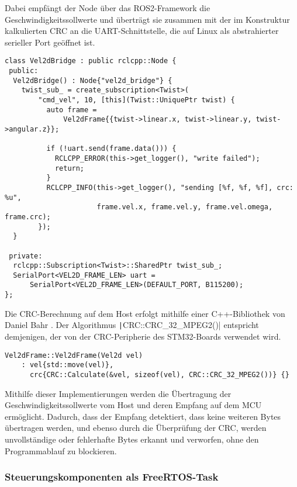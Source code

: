 Dabei empfängt der Node über das ROS2-Framework die Geschwindigkeitssollwerte
und überträgt sie zusammen mit der im Konstruktur kalkulierten CRC an die
UART-Schnittstelle, die auf Linux als abstrahierter serieller Port geöffnet ist.

\begin{code}
\begin{verbatim}
class Vel2dBridge : public rclcpp::Node {
 public:
  Vel2dBridge() : Node{"vel2d_bridge"} {
    twist_sub_ = create_subscription<Twist>(
        "cmd_vel", 10, [this](Twist::UniquePtr twist) {
          auto frame =
              Vel2dFrame{{twist->linear.x, twist->linear.y, twist->angular.z}};

          if (!uart.send(frame.data())) {
            RCLCPP_ERROR(this->get_logger(), "write failed");
            return;
          }
          RCLCPP_INFO(this->get_logger(), "sending [%f, %f, %f], crc: %u",
                      frame.vel.x, frame.vel.y, frame.vel.omega, frame.crc);
        });
  }

 private:
  rclcpp::Subscription<Twist>::SharedPtr twist_sub_;
  SerialPort<VEL2D_FRAME_LEN> uart =
      SerialPort<VEL2D_FRAME_LEN>(DEFAULT_PORT, B115200);
};
\end{verbatim}
\end{code}

Die CRC-Berechnung auf dem Host erfolgt mithilfe einer C++-Bibliothek von Daniel
Bahr \cite{CRCpp}. Der Algorithmus \texttt|CRC::CRC_32_MPEG2()|
entspricht demjenigen, der von der CRC-Peripherie des STM32-Boards verwendet
wird.

\begin{code}
\begin{verbatim}
Vel2dFrame::Vel2dFrame(Vel2d vel)
    : vel{std::move(vel)},
      crc{CRC::Calculate(&vel, sizeof(vel), CRC::CRC_32_MPEG2())} {}
\end{verbatim}
\end{code}

Mithilfe dieser Implementierungen werden die Übertragung der
Geschwindigkeitssollwerte vom Host und deren Empfang auf dem MCU ermöglicht.
Dadurch, dass der Empfang detektiert, dass keine weiteren Bytes übertragen
werden, und ebenso durch die Überprüfung der CRC, werden unvollständige oder
fehlerhafte Bytes erkannt und verworfen, ohne den Programmablauf zu blockieren.

\subsubsection{Steuerungskomponenten als FreeRTOS-Task}

